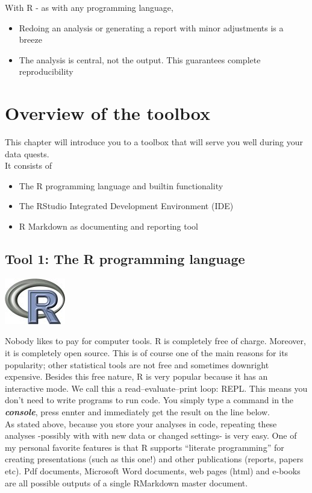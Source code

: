 \documentclass[]{book}
\providecommand{\tightlist}{%
  \setlength{\itemsep}{0pt}\setlength{\parskip}{0pt}}
\begin{document}
With R - as with any programming language,

\begin{itemize}
\tightlist
\item
  Redoing an analysis or generating a report with minor adjustments is a breeze
\item
  The analysis is central, not the output. This guarantees complete reproducibility
\end{itemize}

\hypertarget{overview-of-the-toolbox}{%
\section{Overview of the toolbox}\label{overview-of-the-toolbox}}

This chapter will introduce you to a toolbox that will serve you well during your data quests.\\
It consists of

\begin{itemize}
\tightlist
\item
  The R programming language and builtin functionality
\item
  The RStudio Integrated Development Environment (IDE)
\item
  R Markdown as documenting and reporting tool
\end{itemize}

\hypertarget{tool-1-the-r-programming-language}{%
\subsection{Tool 1: The R programming language}\label{tool-1-the-r-programming-language}}

\includegraphics{figures/Rlogo.jpg}

Nobody likes to pay for computer tools. R is completely free of charge. Moreover, it is completely open source. This is of course one of the main reasons for its popularity; other statistical tools are not free and sometimes downright expensive.
Besides this free nature, R is very popular because it has an interactive mode. We call this a read--evaluate--print loop: REPL. This means you don't need to write programs to run code. You simply type a command in the \textbf{\emph{console}}, press ennter and immediately get the result on the line below.\\
As stated above, because you store your analyses in code, repeating these analyses -possibly with with new data or changed settings- is very easy.
One of my personal favorite features is that R supports ``literate programming'' for creating presentations (such as this one!) and other publications (reports, papers etc). Pdf documents, Microsoft Word documents, web pages (html) and e-books are all possible outputs of a single RMarkdown master document.
\end{document}
